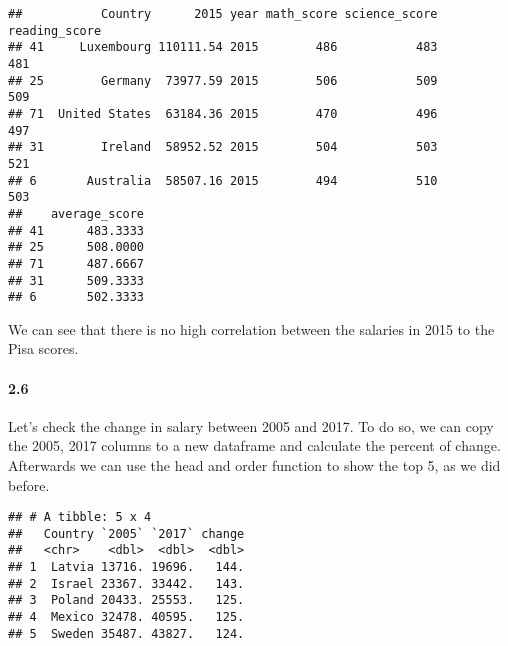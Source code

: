 \documentclass[]{article}
\newenvironment{Shaded}{\begin{snugshade}}{\end{snugshade}}
\newcommand{\KeywordTok}[1]{\textcolor[rgb]{0.13,0.29,0.53}{\textbf{#1}}}
\newcommand{\DataTypeTok}[1]{\textcolor[rgb]{0.13,0.29,0.53}{#1}}
\newcommand{\DecValTok}[1]{\textcolor[rgb]{0.00,0.00,0.81}{#1}}
\newcommand{\StringTok}[1]{\textcolor[rgb]{0.31,0.60,0.02}{#1}}
\newcommand{\OtherTok}[1]{\textcolor[rgb]{0.56,0.35,0.01}{#1}}
\newcommand{\OperatorTok}[1]{\textcolor[rgb]{0.81,0.36,0.00}{\textbf{#1}}}
\newcommand{\NormalTok}[1]{#1}
\let\oldparagraph\paragraph
\renewcommand{\paragraph}[1]{\oldparagraph{#1}\mbox{}}
\begin{document}
\begin{verbatim}
##           Country      2015 year math_score science_score reading_score
## 41     Luxembourg 110111.54 2015        486           483           481
## 25        Germany  73977.59 2015        506           509           509
## 71  United States  63184.36 2015        470           496           497
## 31        Ireland  58952.52 2015        504           503           521
## 6       Australia  58507.16 2015        494           510           503
##    average_score
## 41      483.3333
## 25      508.0000
## 71      487.6667
## 31      509.3333
## 6       502.3333
\end{verbatim}

We can see that there is no high correlation between the salaries in
2015 to the Pisa scores.

\paragraph{2.6}\label{section-9}

Let's check the change in salary between 2005 and 2017. To do so, we can
copy the 2005, 2017 columns to a new dataframe and calculate the percent
of change. Afterwards we can use the head and order function to show the
top 5, as we did before.

\begin{Shaded}
\end{Shaded}

\begin{verbatim}
## # A tibble: 5 x 4
##   Country `2005` `2017` change
##   <chr>    <dbl>  <dbl>  <dbl>
## 1  Latvia 13716. 19696.   144.
## 2  Israel 23367. 33442.   143.
## 3  Poland 20433. 25553.   125.
## 4  Mexico 32478. 40595.   125.
## 5  Sweden 35487. 43827.   124.
\end{verbatim}
\end{document}
